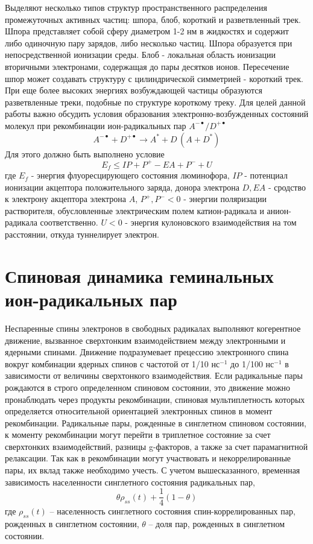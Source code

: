 \documentclass[14pt,titlepage]{extarticle}
\let\oldsection\section
\renewcommand{\section}{\newpage\oldsection}
\begin{document}
Выделяют несколько типов структур пространственного распределения промежуточных активных частиц: шпора, блоб, короткий и разветвленный трек. Шпора представляет собой сферу диаметром 1-2 нм в жидкостях и содержит либо одиночную пару зарядов, либо несколько частиц. Шпора образуется при непосредственной ионизации среды. Блоб - локальная область ионизации вторичными электронами, содержащая до пары десятков ионов. Пересечение шпор может создавать структуру с цилиндрической симметрией - короткий трек. При еще более высоких энергиях возбуждающей частицы образуются разветвленные треки, подобные по структуре короткому треку.
Для целей данной работы важно обсудить условия образования электронно-возбужденных состояний молекул при рекомбинации ион-радикальных пар \( A^{-\bullet}/D^{+\bullet} \)
\begin{equation} A^{-\bullet}+D^{+\bullet}\rightarrow A^*+D \,(A+D^*) \end{equation}
Для этого должно быть выполнено условие
\begin{equation} E_f \le IP+P^+-EA+P^-+U \end{equation}
где \(E_f\) - энергия флуоресцирующего состояния люминофора, \(IP\) - потенциал ионизации акцептора положительного заряда, донора электрона \(D, EA\) - сродство к электрону акцептора электрона \(A\), \(P^+,P^-<0\) - энергии поляризации растворителя, обусловленные электрическим полем катион-радикала и анион-радикала соответственно. \(U<0\) - энергия кулоновского взаимодействия на том расстоянии, откуда туннелирует электрон.

\oldsection{\texorpdfstring{Спиновая динамика геминальных  \\ ион-радикальных пар}{Спиновая динамика геминальных ион-радикальных пар}}

Неспаренные спины электронов в свободных радикалах выполняют когерентное движение, вызванное сверхтонким взаимодействием между электронными и ядерными спинами. Движение подразумевает прецессию электронного спина вокруг комбинации ядерных спинов с частотой от 1/10 нс\(^{-1}\) до 1/100 нс\(^{-1}\) в зависимости от величины сверхтонкого взаимодействия. Если радикальные пары рождаются в строго определенном спиновом состоянии, это движение можно пронаблюдать через продукты рекомбинации, спиновая мультиплетность которых определяется относительной ориентацией электронных спинов в момент рекомбинации. Радикальные пары, рожденные в синглетном спиновом состоянии, к моменту рекомбинации могут перейти в триплетное состояние за счет сверхтонких взаимодействий, разницы g-факторов, а также за счет парамагнитной релаксации. Так как в рекомбинации могут участвовать и некоррелированные пары, их вклад также необходимо учесть. С учетом вышесказанного, временная зависимость населенности синглетного состояния радикальных пар,
\begin{equation} \theta \rho_{ss}(t)+\frac{1}{4} (1-\theta) \end{equation}
где \(\rho_{ss}(t)\) – населенность синглетного состояния спин-коррелированных пар, рожденных в синглетном состоянии, \(\theta\) – доля пар, рожденных в синглетном состоянии. 
\end{document}
